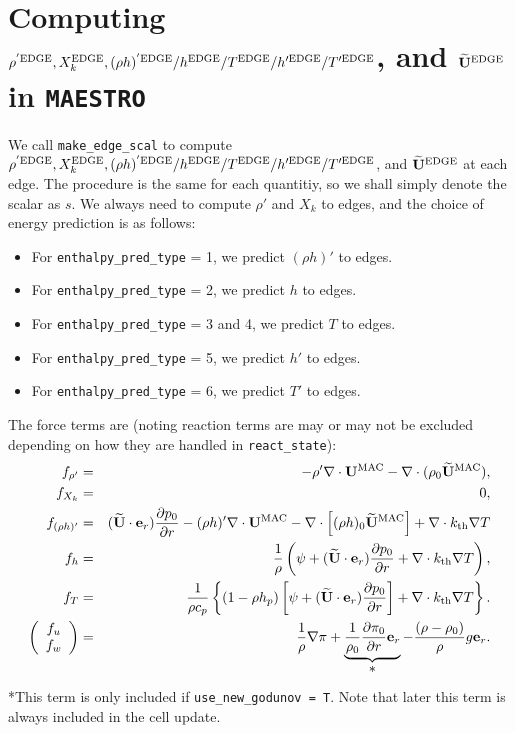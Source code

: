 \newpage

\section{Computing $\rho^{'\rm EDGE}, X_k^{\rm EDGE},(\rho h)^{'\rm EDGE} / h^{\rm EDGE} / T^{\rm EDGE} / h'^{\rm EDGE} / T'^{\rm EDGE}$, and $\widetilde{{\bf U}}^{\rm EDGE}$ in {\tt MAESTRO}}
We call {\tt make\_edge\_scal} to compute $\rho^{'\rm EDGE}, X_k^{\rm EDGE}, 
(\rho h)^{'\rm EDGE} / h^{\rm EDGE} / T^{\rm EDGE} / h'^{\rm EDGE} / T'^{\rm EDGE}$, 
and $\widetilde{{\bf U}}^{\rm EDGE}$ at each edge.
The procedure is the same for each quantitiy, so we shall simply denote 
the scalar as $s$.  We always need to compute $\rho'$ and $X_k$ to edges, 
and the choice of energy prediction is as follows:
\begin{itemize}
\item For {\tt enthalpy\_pred\_type} = 1, we predict $(\rho h)'$ to edges.
\item For {\tt enthalpy\_pred\_type} = 2, we predict $h$ to edges.
\item For {\tt enthalpy\_pred\_type} = 3 and 4, we predict $T$ to edges.
\item For {\tt enthalpy\_pred\_type} = 5, we predict $h'$ to edges.
\item For {\tt enthalpy\_pred\_type} = 6, we predict $T'$ to edges.
\end{itemize}
The force terms are (noting reaction terms are may or may not be excluded 
depending on how they are handled in {\tt react\_state}):
\begin{eqnarray}
f_{\rho'} &=& -\rho'\nabla\cdot{\bf U}^{\rm MAC} - \nabla\cdot(\rho_0\widetilde{{\bf U}}^{\rm MAC}), \\
f_{X_k} &=& 0, \\
f_{(\rho h)'} &=& (\widetilde{{\bf U}}\cdot{\bf e}_r)\frac{\partial p_0}{\partial r} -(\rho h)'\nabla\cdot{\bf U}^{\rm MAC} - \nabla\cdot\left[(\rho h)_0\widetilde{{\bf U}}^{\rm MAC}\right] + \nabla\cdot k_{\rm th}\nabla T \\
f_h &=& \frac{1}{\rho}\left(\psi + (\widetilde{{\bf U}}\cdot{\bf e}_r)\frac{\partial p_0}{\partial r} + \nabla\cdot k_{\rm th}\nabla T \right), \\
f_T &=& \frac{1}{\rho c_p}\left\{(1-\rho h_p)\left[\psi + (\widetilde{{\bf U}}\cdot{\bf e}_r)\frac{\partial p_0}{\partial r}\right] + \nabla\cdot k_{\rm th}\nabla T \right\}. \\
\left(\begin{array}{c}
f_u \\
f_w \\
\end{array}\right)
&=& \frac{1}{\rho}\nabla\pi + \underbrace{\frac{1}{\rho_0}\frac{\partial\pi_0}{\partial r}{\bf e}_r}_{\hbox{*}} - \frac{(\rho-\rho_0)}{\rho}g{\bf e}_r.
\end{eqnarray}
*This term is only included if {\tt use\_new\_godunov = T}.  Note that 
later this term is always included in the cell update.
